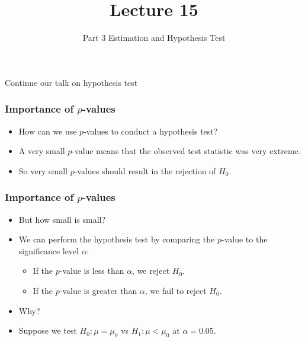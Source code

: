 \documentclass[12pt]{beamer}
\title[ECON2843]{Lecture 15}
\subtitle{Part 3 Estimation and Hypothesis Test}
\date{}
\begin{document}
	\begin{frame}
		\titlepage
	\end{frame}
	\begin{frame}
		\vspace{1cm}
		\centering
		{\color{blue}\large Continue our talk on hypothesis test}
	\end{frame}
	
\begin{frame}
	\frametitle{Importance of $p$-values}
	
	\begin{itemize}[label={\color{blue}$\blacktriangleright$}]
		\item How can we use $p$-values to conduct a hypothesis test?
		\item A very small $p$-value means that the observed test statistic was very extreme.
		\item So very small $p$-values should result in the rejection of $H_0$.
	\end{itemize}
	
\end{frame}
\begin{frame}
	\frametitle{Importance of $p$-values}
	
	\begin{itemize}[label={\color{blue}$\blacktriangleright$}]
		\item But how small is small?
		\item We can perform the hypothesis test by comparing the $p$-value to the significance level $\alpha$:
		\begin{itemize}[label={\color{blue}$\blacktriangleright$}]
			\item If the $p$-value is less than $\alpha$, we reject $H_0$.
			\item If the $p$-value is greater than $\alpha$, we fail to reject $H_0$.
		\end{itemize}
		\item Why?
		\item Suppose we test $H_0 : \mu = \mu_0$ vs $H_1 : \mu < \mu_0$ at $\alpha = 0.05$.
	\end{itemize}
	
\end{frame}
\end{document}

